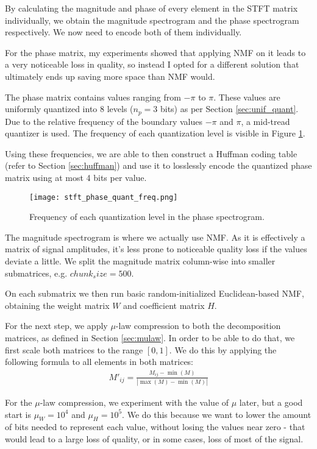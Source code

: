 By calculating the magnitude and phase of every element in the STFT matrix individually, we obtain the magnitude spectrogram and the phase spectrogram respectively. We now need to encode both of them individually.

For the phase matrix, my experiments showed that applying NMF on it leads to a very noticeable loss in quality, so instead I opted for a different solution that ultimately ends up saving more space than NMF would.

The phase matrix contains values ranging from $-\pi$ to $\pi$. These values are uniformly quantized into 8 levels ($n_p = 3$ bits) as per Section \ref{sec:unif_quant}. Due to the relative frequency of the boundary values $-\pi$ and $\pi$, a mid-tread quantizer is used. The frequency of each quantization level is visible in Figure \ref{fig:stft_phase_quant_freq}.

Using these frequencies, we are able to then construct a Huffman coding table (refer to Section \ref{sec:huffman}) and use it to losslessly encode the quantized phase matrix using at most 4 bits per value.

\begin{figure}[ht]
	\caption[ANMF-STFT quantized phase frequencies]{Frequency of each quantization level in the phase spectrogram.}
	\label{fig:stft_phase_quant_freq}
	\centering
	\texttt{[image: stft\_phase\_quant\_freq.png]}
\end{figure}

The magnitude spectrogram is where we actually use NMF. As it is effectively a matrix of signal amplitudes, it's less prone to noticeable quality loss if the values deviate a little. We split the magnitude matrix column-wise into smaller submatrices, e.g. $chunk_size = 500$.

On each submatrix we then run basic random-initialized Euclidean-based NMF, obtaining the weight matrix $W$ and coefficient matrix $H$.

For the next step, we apply $\mu$-law compression to both the decomposition matrices, as defined in Section \ref{sec:mulaw}. In order to be able to do that, we first scale both matrices to the range $[0, 1]$. We do this by applying the following formula to all elements in both matrices:
\begin{align}
M'_{ij} = \frac{M_{ij} - \min(M)}{|\max(M) - \min(M)|}
\end{align}

For the $\mu$-law compression, we experiment with the value of $\mu$ later, but a good start is $\mu_W = 10^4$ and $\mu_H = 10^5$. We do this because we want to lower the amount of bits needed to represent each value, without losing the values near zero - that would lead to a large loss of quality, or in some cases, loss of most of the signal.

